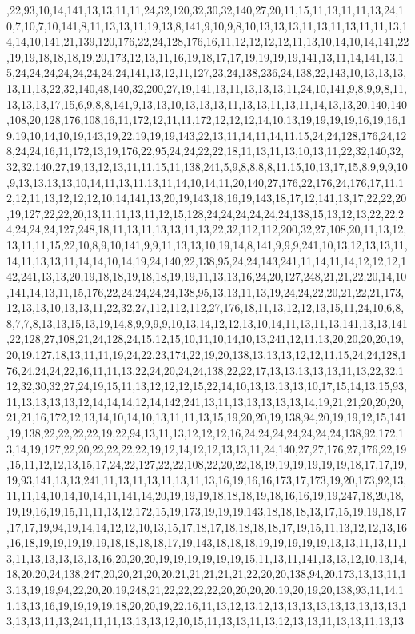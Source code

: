 ,22,93,10,14,141,13,13,11,11,24,32,120,32,30,32,140,27,20,11,15,11,13,11,11,13,24,10,7,10,7,10,141,8,11,13,13,11,19,13,8,141,9,10,9,8,10,13,13,13,11,13,11,13,11,11,13,14,14,10,141,21,139,120,176,22,24,128,176,16,11,12,12,12,12,11,13,10,14,10,14,141,22,19,19,18,18,18,19,20,173,12,13,11,16,19,18,17,17,19,19,19,19,141,13,11,14,141,13,15,24,24,24,24,24,24,24,24,141,13,12,11,127,23,24,138,236,24,138,22,143,10,13,13,13,13,11,13,22,32,140,48,140,32,200,27,19,141,13,11,13,13,13,11,24,10,141,9,8,9,9,8,11,13,13,13,17,15,6,9,8,8,141,9,13,13,10,13,13,13,11,13,13,11,13,11,14,13,13,20,140,140,108,20,128,176,108,16,11,172,12,11,11,172,12,12,12,14,10,13,19,19,19,19,16,19,16,19,19,10,14,10,19,143,19,22,19,19,19,143,22,13,11,14,11,14,11,15,24,24,128,176,24,128,24,24,16,11,172,13,19,176,22,95,24,24,22,22,18,11,13,11,13,10,13,11,22,32,140,32,32,32,140,27,19,13,12,13,11,11,15,11,138,241,5,9,8,8,8,8,11,15,10,13,17,15,8,9,9,9,10,9,13,13,13,13,10,14,11,13,11,13,11,14,10,14,11,20,140,27,176,22,176,24,176,17,11,12,12,11,13,12,12,12,10,14,141,13,20,19,143,18,16,19,143,18,17,12,141,13,17,22,22,20,19,127,22,22,20,13,11,11,13,11,12,15,128,24,24,24,24,24,24,138,15,13,12,13,22,22,24,24,24,24,127,248,18,11,13,11,13,13,11,13,22,32,112,112,200,32,27,108,20,11,13,12,13,11,11,15,22,10,8,9,10,141,9,9,11,13,13,10,19,14,8,141,9,9,9,241,10,13,12,13,13,11,14,11,13,13,11,14,14,10,14,19,24,140,22,138,95,24,24,143,241,11,14,11,14,12,12,12,142,241,13,13,20,19,18,18,19,18,18,19,19,11,13,13,16,24,20,127,248,21,21,22,20,14,10,141,14,13,11,15,176,22,24,24,24,24,138,95,13,13,11,13,19,24,24,22,20,21,22,21,173,12,13,13,10,13,13,11,22,32,27,112,112,112,27,176,18,11,13,12,12,13,15,11,24,10,6,8,8,7,7,8,13,13,15,13,19,14,8,9,9,9,9,10,13,14,12,12,13,10,14,11,13,11,13,141,13,13,141,22,128,27,108,21,24,128,24,15,12,15,10,11,10,14,10,13,241,12,11,13,20,20,20,20,19,20,19,127,18,13,11,11,19,24,22,23,174,22,19,20,138,13,13,13,12,12,11,15,24,24,128,176,24,24,24,22,16,11,11,13,22,24,20,24,24,138,22,22,17,13,13,13,13,13,11,13,22,32,112,32,30,32,27,24,19,15,11,13,12,12,12,15,22,14,10,13,13,13,13,10,17,15,14,13,15,93,11,13,13,13,13,12,14,14,14,12,14,142,241,13,11,13,13,13,13,13,14,19,21,21,20,20,20,21,21,16,172,12,13,14,10,14,10,13,11,11,13,15,19,20,20,19,138,94,20,19,19,12,15,141,19,138,22,22,22,22,19,22,94,13,11,13,12,12,12,16,24,24,24,24,24,24,24,138,92,172,13,14,19,127,22,20,22,22,22,22,19,12,14,12,12,13,13,11,24,140,27,27,176,27,176,22,19,15,11,12,12,13,15,17,24,22,127,22,22,108,22,20,22,18,19,19,19,19,19,19,18,17,17,19,19,93,141,13,13,241,11,13,11,13,11,13,11,13,16,19,16,16,173,17,173,19,20,173,92,13,11,11,14,10,14,10,14,11,141,14,20,19,19,19,18,18,18,19,18,16,16,19,19,247,18,20,18,19,19,16,19,15,11,11,13,12,172,15,19,173,19,19,19,143,18,18,18,13,17,15,19,19,18,17,17,17,19,94,19,14,14,12,12,10,13,15,17,18,17,18,18,18,18,17,19,15,11,13,12,12,13,16,16,18,19,19,19,19,19,18,18,18,18,17,19,143,18,18,18,19,19,19,19,19,13,13,11,13,11,13,11,13,13,13,13,13,16,20,20,20,19,19,19,19,19,19,15,11,13,11,141,13,13,12,10,13,14,18,20,20,24,138,247,20,20,21,20,20,21,21,21,21,21,22,20,20,138,94,20,173,13,13,11,13,13,19,19,94,22,20,20,19,248,21,22,22,22,22,20,20,20,20,19,20,19,20,138,93,11,14,11,13,13,16,19,19,19,19,18,20,20,19,22,16,11,13,12,13,12,13,13,13,13,13,13,13,13,13,13,13,13,11,13,241,11,11,13,13,13,12,10,15,11,13,13,11,13,12,13,13,11,13,13,11,13,13